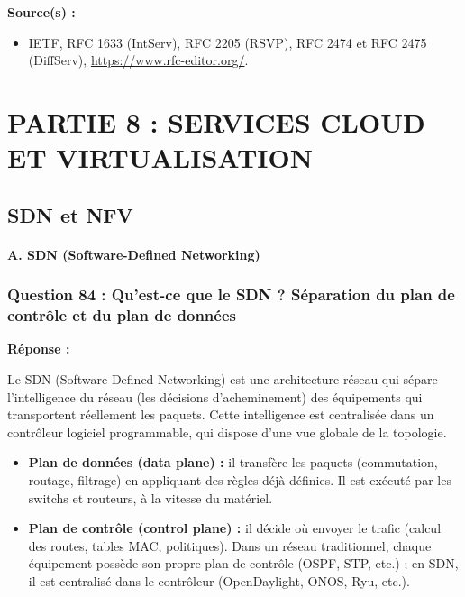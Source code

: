 \documentclass[12pt,a4paper]{article}
\newcommand{\reponse}{\textbf{Réponse :}\par}
\newcommand{\sources}{\textbf{Source(s) :}}
\begin{document}
\sources
\begin{itemize}
    \item IETF, RFC 1633 (IntServ), RFC 2205 (RSVP), RFC 2474 et
    RFC 2475 (DiffServ), \url{https://www.rfc-editor.org/}.
\end{itemize}

\section{PARTIE 8 : SERVICES CLOUD ET VIRTUALISATION}
\subsection{ SDN et NFV}


\paragraph{A. SDN (Software-Defined Networking)}

\subsubsection*{Question 84 : Qu'est-ce que le SDN ? Séparation du plan de contrôle et du plan de données}

\reponse
Le SDN (Software-Defined Networking) est une architecture réseau qui
sépare l'intelligence du réseau (les décisions d'acheminement) des
équipements qui transportent réellement les paquets. Cette intelligence
est centralisée dans un contrôleur logiciel programmable, qui dispose
d'une vue globale de la topologie.

\begin{itemize}
    \item \textbf{Plan de données (data plane) :} il transfère les
    paquets (commutation, routage, filtrage) en appliquant des règles
    déjà définies. Il est exécuté par les switchs et routeurs, à la
    vitesse du matériel.
    \item \textbf{Plan de contrôle (control plane) :} il décide où
    envoyer le trafic (calcul des routes, tables MAC, politiques). Dans
    un réseau traditionnel, chaque équipement possède son propre plan de
    contrôle (OSPF, STP, etc.) ; en SDN, il est centralisé dans le
    contrôleur (OpenDaylight, ONOS, Ryu, etc.).
\end{itemize}
\end{document}
